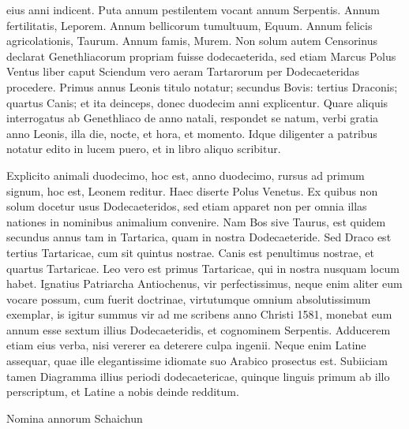 eius anni indicent.
Puta annum pestilentem vocant annum Serpentis.
Annum
fertilitatis, Leporem.
Annum bellicorum tumultuum, Equum.
Annum
felicis agricolationis, Taurum.
Annum famis, Murem.
Non solum
autem Censorinus %
 declarat Genethliacorum propriam fuisse dodecaeterida,
sed etiam Marcus Polus Ventus liber  caput 
Sciendum vero
aeram Tartarorum per Dodecaeteridas procedere.
Primus annus Leonis
titulo notatur; secundus Bovis: tertius Draconis; quartus Canis; et
ita deinceps, donec duodecim anni explicentur.
Quare aliquis interrogatus
ab %
 Genethliaco de anno natali, respondet se natum, verbi gratia
anno Leonis, illa die, nocte, et hora, et momento.
Idque diligenter
a patribus notatur edito in lucem puero, et in libro aliquo scribitur.

Explicito animali duodecimo, hoc est, anno duodecimo, rursus ad
primum signum, hoc est, Leonem reditur.
Haec diserte Polus Venetus.
Ex quibus non solum docetur usus Dodecaeteridos, sed etiam apparet
non per omnia illas nationes in nominibus animalium convenire.
Nam Bos sive Taurus, est quidem secundus annus tam in Tartarica,
quam in nostra Dodecaeteride.
Sed Draco est tertius Tartaricae, cum
sit quintus nostrae.
Canis est penultimus nostrae, et quartus Tartaricae.
Leo vero est primus Tartaricae, qui in nostra nusquam locum habet.
Ignatius Patriarcha Antiochenus, vir perfectissimus, neque enim aliter
eum vocare possum, cum fuerit doctrinae, virtutumque omnium
absolutissimum exemplar, is igitur summus vir ad me scribens anno
Christi 1581, monebat eum annum esse sextum illius Dodecaeteridis,
et cognominem Serpentis.
Adducerem etiam eius verba, nisi vererer
ea deterere culpa ingenii.
Neque enim Latine assequar, quae ille elegantissime
idiomate suo Arabico prosectus est.
Subiiciam tamen
Diagramma illius periodi dodecaetericae, quinque linguis primum ab
illo perscriptum, et Latine a nobis deinde redditum. %

\begin{table}[htbp]
  \centering
  
  \caption{Nomina annorum Schaichun}
\end{table}

